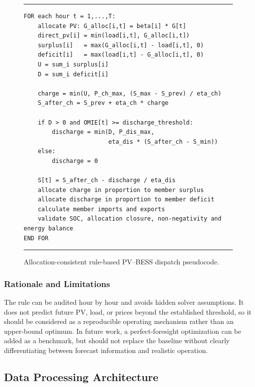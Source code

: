 \begin{figure}[H]
\centering
\begin{minipage}{0.94\textwidth}
\hrule\vspace{0.15cm}
\small
\begin{verbatim}
FOR each hour t = 1,...,T:
    allocate PV: G_alloc[i,t] = beta[i] * G[t]
    direct_pv[i] = min(load[i,t], G_alloc[i,t])
    surplus[i]   = max(G_alloc[i,t] - load[i,t], 0)
    deficit[i]   = max(load[i,t] - G_alloc[i,t], 0)
    U = sum_i surplus[i]
    D = sum_i deficit[i]

    charge = min(U, P_ch_max, (S_max - S_prev) / eta_ch)
    S_after_ch = S_prev + eta_ch * charge

    if D > 0 and OMIE[t] >= discharge_threshold:
        discharge = min(D, P_dis_max,
                        eta_dis * (S_after_ch - S_min))
    else:
        discharge = 0

    S[t] = S_after_ch - discharge / eta_dis
    allocate charge in proportion to member surplus
    allocate discharge in proportion to member deficit
    calculate member imports and exports
    validate SOC, allocation closure, non-negativity and energy balance
END FOR
\end{verbatim}
\vspace{0.15cm}\hrule
\end{minipage}
\caption{Allocation-consistent rule-based PV--BESS dispatch pseudocode.}
\label{fig:ch4_dispatch_pseudocode}
\end{figure}

\subsubsection{Rationale and Limitations}
\label{subsec:dispatch_rationale_limitations}

The rule can be audited hour by hour and avoids hidden solver assumptions. It does not predict future PV, load, or prices beyond the established threshold, so it should be considered as a reproducible operating mechanism rather than an upper-bound optimum. In future work, a perfect-foresight optimization can be added as a benchmark, but should not replace the baseline without clearly differentiating between forecast information and realistic operation.

\subsection{Data Processing Architecture}
\label{sec:data_processing_architecture}

